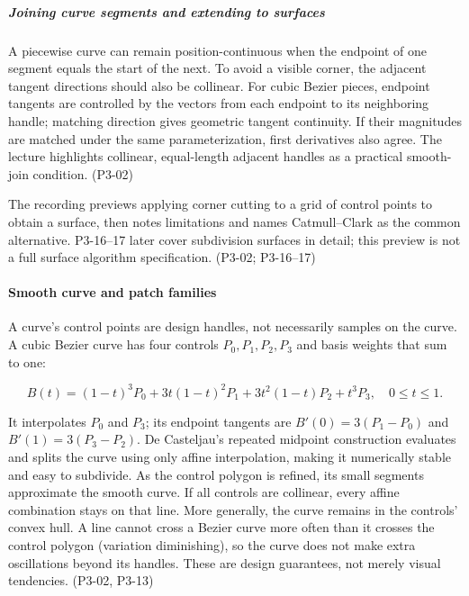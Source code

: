 \subparagraph{Joining curve segments and extending to surfaces}\label{03-visual-computing-i-ch001-joining-curve-segments-and-extending-to-surfaces}

\hypertarget{03-visual-computing-i-ch001-joining-curve-segments-and-extending-to-surfaces}{}

A piecewise curve can remain position-continuous when the endpoint of one segment equals the start of the next. To avoid a visible corner, the adjacent tangent directions should also be collinear. For cubic Bezier pieces, endpoint tangents are controlled by the vectors from each endpoint to its neighboring handle; matching direction gives geometric tangent continuity. If their magnitudes are matched under the same parameterization, first derivatives also agree. The lecture highlights collinear, equal-length adjacent handles as a practical smooth-join condition. (P3-02)

The recording previews applying corner cutting to a grid of control points to obtain a surface, then notes limitations and names Catmull--Clark as the common alternative. P3-16--17 later cover subdivision surfaces in detail; this preview is not a full surface algorithm specification. (P3-02; P3-16--17)

\paragraph{Smooth curve and patch families}\label{03-visual-computing-i-ch001-smooth-curve-and-patch-families}

\hypertarget{03-visual-computing-i-ch001-smooth-curve-and-patch-families}{}

A curve's control points are design handles, not necessarily samples on the curve. A cubic Bezier curve has four controls \(P_0,P_1,P_2,P_3\) and basis weights that sum to one:

\[
B(t)=(1-t)^3P_0+3t(1-t)^2P_1+3t^2(1-t)P_2+t^3P_3,\quad 0\le t\le1.
\]

It interpolates \(P_0\) and \(P_3\); its endpoint tangents are \(B'(0)=3(P_1-P_0)\) and \(B'(1)=3(P_3-P_2)\). De Casteljau's repeated midpoint construction evaluates and splits the curve using only affine interpolation, making it numerically stable and easy to subdivide. As the control polygon is refined, its small segments approximate the smooth curve. If all controls are collinear, every affine combination stays on that line. More generally, the curve remains in the controls' convex hull. A line cannot cross a Bezier curve more often than it crosses the control polygon (variation diminishing), so the curve does not make extra oscillations beyond its handles. These are design guarantees, not merely visual tendencies. (P3-02, P3-13)

